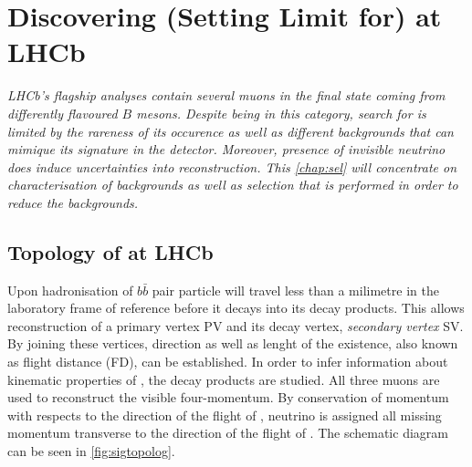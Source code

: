 
\chapter{Discovering (Setting Limit for) \boldmath{\Bmumumu} at LHCb}
\label{chap:sel}

\textit{LHCb's flagship analyses contain several muons in the final state coming from differently flavoured $B$ mesons. Despite being in this category, search for \Bmumumu is limited by the rareness of its occurence as well as different backgrounds that can mimique its signature in the detector. Moreover, presence of invisible neutrino does induce uncertainties into reconstruction. This \autoref{chap:sel} will concentrate on characterisation of backgrounds as well as selection that is performed in order to reduce the backgrounds.}


\section{Topology of \Bmumumu at LHCb}

Upon hadronisation of $b\bar{b}$ pair \Bpm particle will travel less than a milimetre in the laboratory frame of reference before it decays into its decay products. This allows reconstruction of a primary vertex \Gls{PV} and its decay vertex, \textit{secondary vertex} \Gls{SV}. By joining these vertices, direction as well as lenght of the \Bpm existence, also known as flight distance (\Gls{FD}), can be established. In order to infer information about kinematic properties of \Bpm, the decay products are studied. All three muons are used to reconstruct the visible four-momentum. By conservation of momentum with respects to the direction of the flight of \Bpm, neutrino is assigned all missing momentum transverse to the direction of the flight of \Bpm. The schematic diagram can be seen in \autoref{fig:sigtopolog}.



